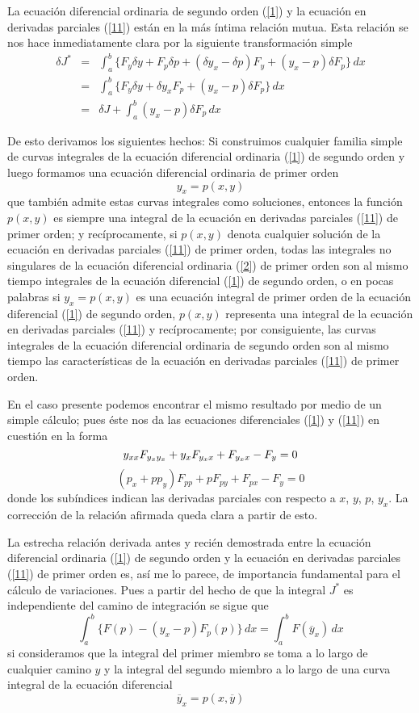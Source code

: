 \documentclass[a4paper, 12pt]{article}
\begin{document}
{La ecuación diferencial ordinaria de segundo orden (\ref{1}) y la ecuación en derivadas parciales (\ref{11}) están en la más íntima relación mutua. Esta relación se nos hace inmediatamente clara por la siguiente transformación simple
\begin{eqnarray*}
\delta J^* &=& \int_a^b\{F_y\delta y+F_p\delta p+(\delta y_x-\delta p)F_y+(y_x-p)\delta F_p\} \, dx\\
 &= & \int_a^b\{F_y\delta y+\delta y_x F_p +(y_x-p)\delta F_p\}\, dx\\
  &= & \delta J+ \int_a^b (y_x-p) \delta F_p \, dx
\end{eqnarray*}

De esto derivamos los siguientes hechos: Si construimos cualquier familia simple de curvas integrales de la ecuación diferencial ordinaria (\ref{1}) de segundo orden y luego formamos una ecuación diferencial ordinaria de primer orden
\begin{equation}\label{2}
y_x=p(x,y)
\end{equation}
que también admite estas curvas integrales como soluciones, entonces la función $p(x,y)$ es siempre una integral de la ecuación en derivadas parciales (\ref{11}) de primer orden; y recíprocamente, si $p(x,y)$ denota cualquier solución de la ecuación en derivadas parciales (\ref{11}) de primer orden, todas las integrales no singulares de la ecuación diferencial ordinaria (\ref{2}) de primer orden son al mismo tiempo integrales de la ecuación diferencial (\ref{1}) de segundo orden, o en pocas palabras si $y_x = p(x,y)$ es una ecuación integral de primer orden de la ecuación diferencial (\ref{1}) de segundo orden, $p(x,y)$ representa una integral de la ecuación en derivadas parciales (\ref{11}) y recíprocamente; por consiguiente, las curvas integrales de la ecuación diferencial ordinaria de segundo orden son al mismo tiempo las características de la ecuación en derivadas parciales (\ref{11}) de primer orden.

En el caso presente podemos encontrar el mismo resultado por medio de un simple cálculo; pues éste nos da las ecuaciones diferenciales (\ref{1}) y (\ref{11}) en cuestión en la forma
$$
y_{xx}F_{y_xy_x}+y_x F_{y_x x}+ F_{y_x x}-F_y=0\\
$$
$$
(p_x+pp_y)F_{pp}+pF_{py}+F_{px}-F_y=0
$$
donde los subíndices indican las derivadas parciales con respecto a $x$, $y$, $p$, $y_x$. La corrección de la relación afirmada queda clara a partir de esto.

La estrecha relación derivada antes y recién demostrada entre la ecuación diferencial ordinaria (\ref{1}) de segundo orden y la ecuación en derivadas parciales (\ref{11}) de primer orden es, así me lo parece, de importancia fundamental para el cálculo de variaciones. Pues a partir del hecho de que la integral $J^*$ es independiente del camino de integración se sigue que
\begin{equation}\label{3}
\int_a^b \{ F(p)-(y_x-p)F_p(p)\} \, dx = \int_a^b F (\overline{y}_x) \, dx
\end{equation}
si consideramos que la integral del primer miembro se toma a lo largo de cualquier camino $y$ y la integral del segundo miembro a lo largo de una curva integral de la ecuación diferencial
$$
\overline{y}_x = p(x,\overline{y})
$$

}
\end{document}
